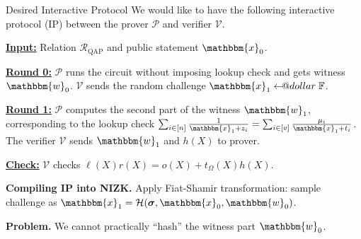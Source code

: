 \documentclass{zkdl-presentation-template}
\makeatletter
\newcommand\leftarrowS{\leftarrow\joinrel\smalldollar}
\newcommand{\smalldollar}{\mathrel{\mathpalette\small@dollar\relax}}
\newcommand{\small@dollar}[2]{%
  \vcenter{\hbox{%
    $#1\textnormal{\fontsize{0.7\dimexpr\f@size pt}{0}\selectfont\$}$%
  }}%
}
\makeatother
\begin{document}
    \begin{frame}{Desired Interactive Protocol}
        We would like to have the following interactive protocol (IP) between
        the prover $\mathcal{P}$ and verifier $\mathcal{V}$.\pause
        \begin{mdframed}[linewidth=1pt]
        \underline{\textbf{Input:}} Relation $\mathcal{R}_{\text{QAP}}$ and public statement
        $\mathbbm{x}_0$.\pause

        \underline{\textbf{Round 0:}} $\mathcal{P}$ runs the circuit without imposing lookup
        check and gets witness $\mathbbm{w}_0$. $\mathcal{V}$ sends the random
        challenge $\mathbbm{x}_1 \leftarrowS \mathbb{F}$.\pause

        \underline{\textbf{Round 1:}} $\mathcal{P}$ computes the second part of the witness
        $\mathbbm{w}_1$, corresponding to the lookup check $\sum_{i \in
        [n]}\frac{1}{\mathbbm{x}_1+z_i} = \sum_{i \in
        [v]}\frac{\mu_i}{\mathbbm{x}_1+t_i}$. The verifier $\mathcal{V}$ sends 
        $\mathbbm{w}_1$ and $h(X)$ to prover.\pause

        \underline{\textbf{Check:}} $\mathcal{V}$ checks $\ell(X)r(X) = o(X) +
        t_{\Omega}(X)h(X)$.\pause
        \end{mdframed}

        \textbf{Compiling IP into NIZK.} Apply Fiat-Shamir transformation:
        sample challenge as $\mathbbm{x}_1=\mathcal{H}(\boldsymbol{\sigma},
        \mathbbm{x}_0, \mathbbm{w}_0)$.\pause

        \textcolor{red!70!black}{\textbf{Problem.}} We cannot practically
        ``hash'' the witness part $\mathbbm{w}_0$.
    \end{frame}
\end{document}
